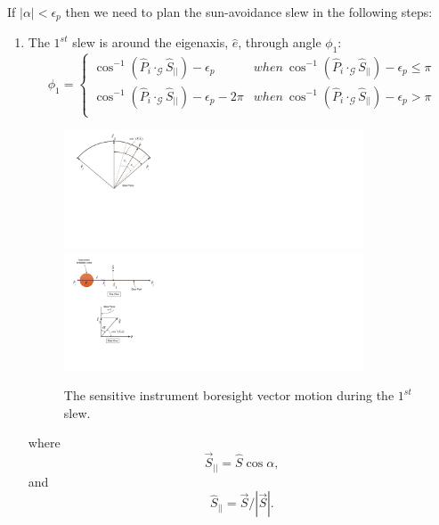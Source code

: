 \documentclass[letterpaper, paper,12pt]{AAS}		%
\begin{document}
	If $|\alpha|<\epsilon_p$ then we need to plan the sun-avoidance slew in the following steps: 
	\begin{enumerate}
		\item The $1^{st}$ slew is around the eigenaxis, $\hat{e}$, through angle $\phi_1$:
		\begin{equation}\label{phi1_1}
		\phi_1=\left\{
		\begin{array}{ll}
		\cos^{-1}(\hat{P}_i\cdot_\mathcal{G}\hat{S}_{||})-\epsilon_p& when\  \cos^{-1}(\hat{P}_i\cdot_\mathcal{G}\hat{S}_{||})-\epsilon_p\leq \pi\\
		\cos^{-1}(\hat{P}_i\cdot_\mathcal{G}\hat{S}_{||})-\epsilon_p-2\pi& when\ \cos^{-1}(\hat{P}_i\cdot_\mathcal{G}\hat{S}_{||})-\epsilon_p>\pi\\
		\end{array}
		\right.
		\end{equation}
		\begin{figure}[htb]

			\begin{center}
				\includegraphics[width=3.5in]{./Figures/SVAS_1r_modified}\includegraphics[width=3.5in]{./Figures/SVAS_1rb_modified}
				\caption{The sensitive instrument boresight vector motion during the $1^{st}$ slew.}
			\end{center}
		\end{figure}
		where 
		\begin{equation}\label{Sbar}
		\vec{S}_{||}=\hat{S}\cos\alpha, 
		\end{equation}
		and
		\begin{equation}\label{Shat}
		\hat{S}_{||}=\vec{S}/|\vec{S}|.
		\end{equation}
	

\end{enumerate}
\end{document}
